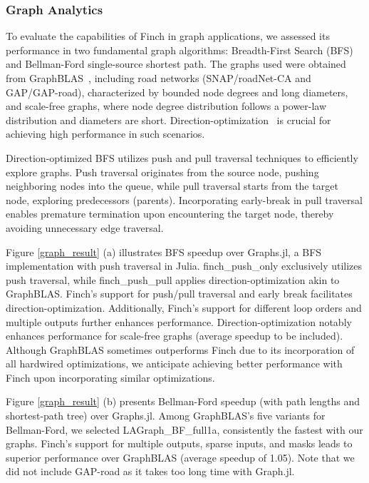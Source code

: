 \subsubsection{Graph Analytics}

To evaluate the capabilities of Finch in graph applications, we assessed its performance in two fundamental graph algorithms: Breadth-First Search (BFS) and Bellman-Ford single-source shortest path. The graphs used were obtained from GraphBLAS~\cite{mattson2019lagraph}, including road networks (SNAP/roadNet-CA and GAP/GAP-road), characterized by bounded node degrees and long diameters, and scale-free graphs, where node degree distribution follows a power-law distribution and diameters are short. Direction-optimization~\cite{beamer2012direction} is crucial for achieving high performance in such scenarios.

Direction-optimized BFS utilizes push and pull traversal techniques to efficiently explore graphs. Push traversal originates from the source node, pushing neighboring nodes into the queue, while pull traversal starts from the target node, exploring predecessors (parents). Incorporating early-break in pull traversal enables premature termination upon encountering the target node, thereby avoiding unnecessary edge traversal.

Figure \ref{graph_result} (a) illustrates BFS speedup over Graphs.jl, a BFS implementation with push traversal in Julia. finch\_push\_only exclusively utilizes push traversal, while finch\_push\_pull applies direction-optimization akin to GraphBLAS. Finch's support for push/pull traversal and early break facilitates direction-optimization. Additionally, Finch's support for different loop orders and multiple outputs further enhances performance. Direction-optimization notably enhances performance for scale-free graphs (average speedup to be included). Although GraphBLAS sometimes outperforms Finch due to its incorporation of all hardwired optimizations, we anticipate achieving better performance with Finch upon incorporating similar optimizations.  

Figure \ref{graph_result} (b) presents Bellman-Ford speedup (with path lengths and shortest-path tree) over Graphs.jl. Among GraphBLAS's five variants for Bellman-Ford, we selected LAGraph\_BF\_full1a, consistently the fastest with our graphs. Finch's support for multiple outputs, sparse inputs, and masks leads to superior performance over GraphBLAS (average speedup of 1.05). Note that we did not include GAP-road as it takes too long time with Graph.jl. 
 
